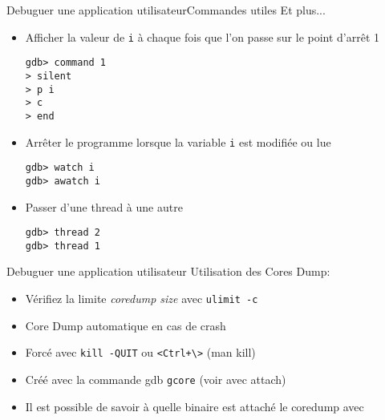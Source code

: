 \begin{frame}[fragile=singleslide]{Debuguer une application utilisateur}{Commandes utiles}
  Et plus...
  \begin{itemize}
  \item Afficher  la valeur de \verb+i+  à chaque fois  que l'on passe
    sur le point d'arrêt 1
    \begin{lstlisting}
gdb> command 1
> silent
> p i
> c
> end
    \end{lstlisting}
  \item Arrêter le programme lorsque la variable \verb+i+ est modifiée
    ou lue
    \begin{lstlisting}
gdb> watch i
gdb> awatch i
      \end{lstlisting}
    \item Passer d'une thread à une autre
      \begin{lstlisting}
gdb> thread 2
gdb> thread 1
      \end{lstlisting}
    \end{itemize}
\end{frame}

\begin{frame}[fragile=singleslide]{Debuguer une application utilisateur}
  Utilisation des Cores Dump:
  \begin{itemize}
  \item Vérifiez la limite \emph{coredump size} avec \texttt{ulimit -c}
  \item Core Dump automatique en cas de crash
  \item Forcé avec \texttt{kill -QUIT} ou \verb|<Ctrl+\>| (man kill)
  \item Créé avec la commande gdb \texttt{gcore} (voir avec attach)
  \item  Il est possible  de savoir  à quelle  binaire est  attaché le
    coredump avec 
  \end{itemize}
\end{frame}

